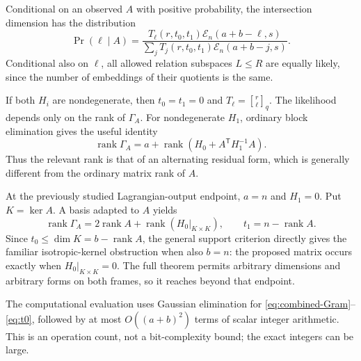 Conditional on an observed $A$ with positive probability, the
intersection dimension has the distribution
\begin{equation}\label{eq:conditional-intersection}
 \Pr(\ell\mid A)=
 \frac{T_\ell(r,t_0,t_1)\mathcal E_n(a+b-\ell,s)}
 {\sum_jT_j(r,t_0,t_1)\mathcal E_n(a+b-j,s)}.
\end{equation}
Conditional also on $\ell$, all allowed relation subspaces
$L\le R$ are equally likely, since the number of embeddings of
their quotients is the same.

If both $H_i$ are nondegenerate, then $t_0=t_1=0$ and
$T_\ell=\genfrac{[}{]}{0pt}{}{r}{\ell}_q$. The likelihood depends
only on the rank of $\Gamma_A$. For nondegenerate $H_1$, ordinary
block elimination gives the useful identity
\begin{equation}\label{eq:Schur-rank}
 \operatorname{rank}\Gamma_A
 =a+\operatorname{rank}(H_0+A^{\mathsf T}H_1^{-1}A).
\end{equation}
Thus the relevant rank is that of an alternating residual form,
which is generally different from the ordinary matrix rank of $A$.

At the previously studied Lagrangian-output endpoint, $a=n$ and
$H_1=0$. Put $K=\ker A$. A basis adapted to $A$ yields
\[
 \operatorname{rank}\Gamma_A
 =2\operatorname{rank}A+\operatorname{rank}(H_0|_{K\times K}),
 \qquad t_1=n-\operatorname{rank}A.
\]
Since $t_0\le\dim K=b-\operatorname{rank}A$, the general support
criterion directly gives the familiar isotropic-kernel obstruction
when also $b=n$: the proposed matrix occurs exactly when
$H_0|_{K\times K}=0$. The full theorem permits arbitrary dimensions
and arbitrary forms on both frames, so it reaches beyond that
endpoint.

The computational evaluation uses Gaussian elimination for
\eqref{eq:combined-Gram}--\eqref{eq:t0}, followed by at most
$O((a+b)^2)$ terms of scalar integer arithmetic. This is an operation
count, not a bit-complexity bound; the exact integers can be large.

